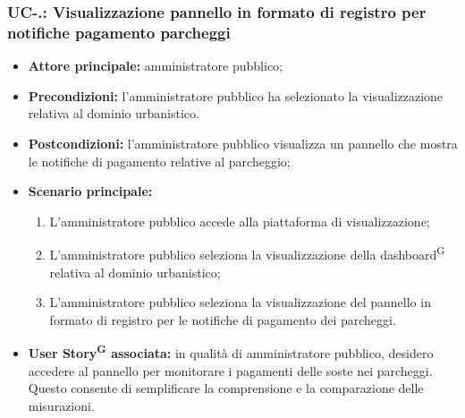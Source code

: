 \documentclass[8pt]{article}
\newcommand{\glossterm}[1]{#1\textsuperscript{G}} %
\begin{document}
\subsubsection*{UC-\theuc .\speconenumber: Visualizzazione pannello in formato di registro per notifiche pagamento parcheggi}
\begin{itemize}
    \item \textbf{Attore principale:} amministratore pubblico;
    \item \textbf{Precondizioni:} l'amministratore pubblico ha selezionato la visualizzazione relativa al dominio urbanistico.
    \item \textbf{Postcondizioni:} l'amministratore pubblico visualizza un pannello che mostra le notifiche di pagamento relative al parcheggio;
    \item \textbf{Scenario principale:} 
    \begin{enumerate}
    \item L'amministratore pubblico accede alla piattaforma di visualizzazione;
    \item L'amministratore pubblico seleziona la visualizzazione della \glossterm{dashboard} relativa al dominio urbanistico;
    \item L'amministratore pubblico seleziona la visualizzazione del pannello in formato di registro per le notifiche di pagamento dei parcheggi.
    \end{enumerate}
    \item \textbf{\glossterm{User Story} associata:} in qualità di amministratore pubblico, desidero accedere al pannello per monitorare i pagamenti delle soste nei parcheggi. Questo consente di semplificare la comprensione e la comparazione delle misurazioni.
\end{itemize}
\end{document}
